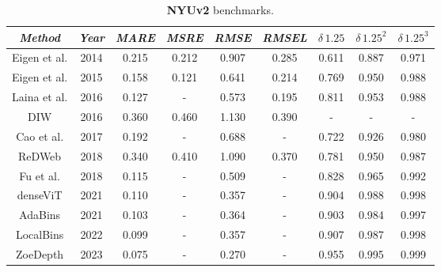 \begin{table}
	\begin{tabular}{c|c|c|c|c|c|c|c|c}
	\emph{Method} & \emph{Year} & \emph{MARE} & \emph{MSRE} & \emph{RMSE} & \emph{RMSEL} & \emph{$\delta \, 1.25$} & \emph{$\delta \, 1.25^{2}$} & \emph{$\delta \, 1.25^{3}$} \\
	\hline
	Eigen et al. \cite{Eigen}                      & 2014 & 0.215 & 0.212 & 0.907 & 0.285 & 0.611 & 0.887 & 0.971 \\
	Eigen et al. \cite{Eigen2}                     & 2015 & 0.158 & 0.121 & 0.641 & 0.214 & 0.769 & 0.950 & 0.988 \\
	Laina et al. \cite{Laina}                      & 2016 & 0.127 &   -   & 0.573 & 0.195 & 0.811 & 0.953 & 0.988 \\
	DIW \cite{DIW}                                 & 2016 & 0.360 & 0.460 & 1.130 & 0.390 &   -   &   -   &   -   \\
	Cao et al.   \cite{depth_as_classification}    & 2017 & 0.192 &   -   & 0.688 &   -   & 0.722 & 0.926 & 0.980 \\
	ReDWeb \cite{ReDWeb}                           & 2018 & 0.340 & 0.410 & 1.090 & 0.370 & 0.781 & 0.950 & 0.987 \\
	Fu et al. \cite{ordinal_regression}            & 2018 & 0.115 &   -   & 0.509 &   -   & 0.828 & 0.965 & 0.992 \\
	denseViT \cite{denseViT}                       & 2021 & 0.110 &   -   & 0.357 &   -   & 0.904 & 0.988 & 0.998 \\
	AdaBins \cite{AdaBins}                         & 2021 & 0.103 &   -   & 0.364 &   -   & 0.903 & 0.984 & 0.997 \\
	LocalBins \cite{LocalBins}                     & 2022 & 0.099 &   -   & 0.357 &   -   & 0.907 & 0.987 & 0.998 \\
	ZoeDepth \cite{ZoeDepth}                       & 2023 & 0.075 &   -   & 0.270 &   -   & 0.955 & 0.995 & 0.999 \\
	\end{tabular}
\caption[Frequently used metrics]{
	\textbf{NYUv2} benchmarks.
	\label{t:NYUv2_benchmarks}
}
\end{table}